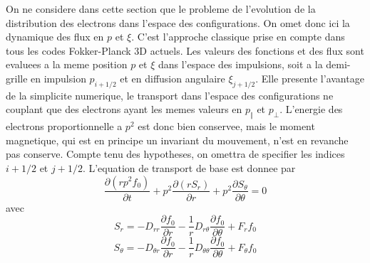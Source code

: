 On ne considere dans cette section que le probleme de l'evolution
de la distribution des electrons dans l'espace des configurations.
On omet donc ici la dynamique des flux en $p$ et $\xi.$ C'est l'approche
classique prise en compte dans tous les codes Fokker-Planck 3D actuels.
Les valeurs des fonctions et des flux sont evaluees a la meme position
$p$ et $\xi$ dans l'espace des impulsions, soit a la demi-grille
en impulsion $p_{i+1/2}$ et en diffusion angulaire $\xi_{j+1/2}$.
Elle presente l'avantage de la simplicite numerique, le transport
dans l'espace des configurations ne couplant que des electrons ayant
les memes valeurs en $p_{\Vert}$ et $p_{\bot}.$ L'energie des electrons
proportionnelle a $p^{2}$ est donc bien conservee, mais le moment
magnetique, qui est en principe un invariant du mouvement, n'est en
revanche pas conserve. Compte tenu des hypotheses, on omettra de specifier
les indices $i+1/2$ et $j+1/2$. L'equation de transport de base
est donnee par \[
\frac{\partial\left(rp^{2}f_{0}\right)}{\partial t}+p^{2}\frac{\partial\left(rS_{r}\right)}{\partial r}+p^{2}\frac{\partial S_{\theta}}{\partial\theta}=0\]
 avec \[
S_{r}=-D_{rr}\frac{\partial f_{0}}{\partial r}-\frac{1}{r}D_{r\theta}\frac{\partial f_{0}}{\partial\theta}+F_{r}f_{0}\]
 \[
S_{\theta}=-D_{\theta r}\frac{\partial f_{0}}{\partial r}-\frac{1}{r}D_{\theta\theta}\frac{\partial f_{0}}{\partial\theta}+F_{\theta}f_{0}\]


